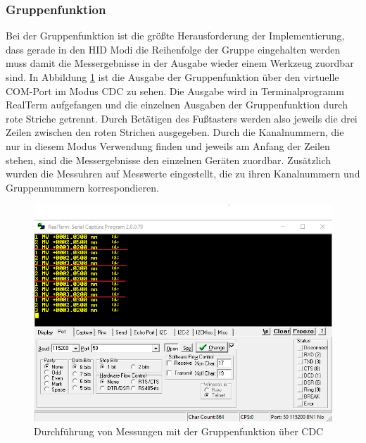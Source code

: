 \subsubsection{Gruppenfunktion}
Bei der Gruppenfunktion ist die größte Herausforderung der Implementierung, dass gerade in den HID Modi die Reihenfolge der Gruppe eingehalten werden muss damit die Messergebnisse in der Ausgabe wieder einem Werkzeug zuordbar sind. In Abbildung \ref{fig:MessungenGruppenfunktionCDC} ist die Ausgabe der Gruppenfunktion über den virtuelle COM-Port im Modus \ac{CDC} zu sehen. Die Ausgabe wird in Terminalprogramm RealTerm aufgefangen und die einzelnen Ausgaben der Gruppenfunktion durch rote Striche getrennt. Durch Betätigen des Fußtasters werden also jeweils die drei Zeilen zwischen den roten Strichen ausgegeben. Durch die Kanalnummern, die nur in diesem Modus Verwendung finden und jeweils am Anfang der Zeilen stehen, sind die Messergebnisse den einzelnen Geräten zuordbar. Zusätzlich wurden die Messuhren auf Messwerte eingestellt, die zu ihren Kanalnummern und Gruppennummern korrespondieren. 
\begin{figure}[H] 
	\centering
	\includegraphics[width=\textwidth]{figures/GroupFeature.png}
	\caption{Durchführung von Messungen mit der Gruppenfunktion über CDC}
	\label{fig:MessungenGruppenfunktionCDC}
\end{figure}

